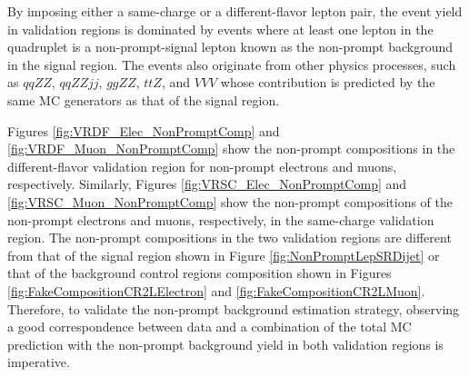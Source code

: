 By imposing either a same-charge or a different-flavor lepton pair, the event yield in validation regions is dominated by events where at least one lepton in the quadruplet is a non-prompt-signal lepton known as the non-prompt background in the signal region. The events also originate from other physics processes, such as $qqZZ$, $qqZZjj$, $ggZZ$, $ttZ$, and $VVV$ whose contribution is predicted by the same MC generators as that of the signal region.

Figures \ref{fig:VRDF_Elec_NonPromptComp} and \ref{fig:VRDF_Muon_NonPromptComp} show the non-prompt compositions in the different-flavor validation region for non-prompt electrons and muons, respectively. Similarly, Figures \ref{fig:VRSC_Elec_NonPromptComp} and \ref{fig:VRSC_Muon_NonPromptComp} show the non-prompt compositions of the non-prompt electrons and muons, respectively, in the same-charge validation region. The non-prompt compositions in the two validation regions are different from that of the signal region shown in Figure \ref{fig:NonPromptLepSRDijet} or that of the background control regions composition shown in Figures \ref{fig:FakeCompositionCR2LElectron} and \ref{fig:FakeCompositionCR2LMuon}. Therefore, to validate the non-prompt background estimation strategy, observing a good correspondence between data and a combination of the total MC prediction with the non-prompt background yield in both validation regions is imperative.

